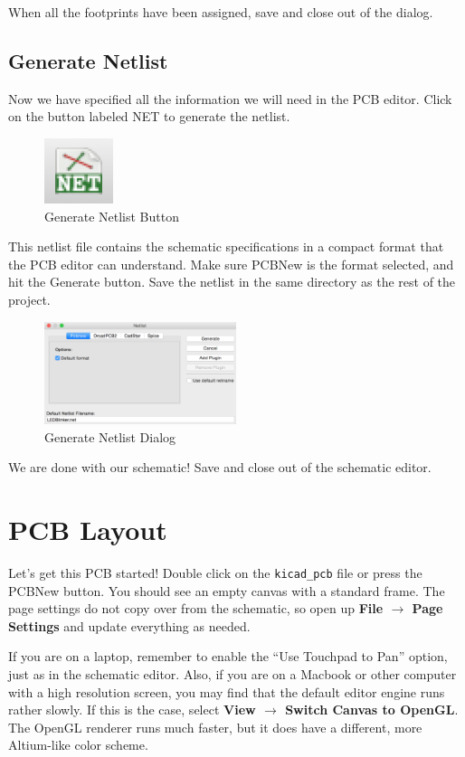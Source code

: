 \documentclass[12pt, oneside]{article}
\begin{document}
When all the footprints have been assigned, save and close out of the dialog.

\subsection{Generate Netlist}
Now we have specified all the information we will need in the PCB editor. Click on the button labeled NET to generate the netlist.

\begin{figure}[H]
\includegraphics{NetlistButton}
\centering
\caption{Generate Netlist Button}
\end{figure}

This netlist file contains the schematic specifications in a compact format that the PCB editor can understand. Make sure PCBNew is the format selected, and hit the Generate button. Save the netlist in the same directory as the rest of the project.

\begin{figure}[H]
\includegraphics[width=0.5\textwidth]{NetlistDialog}
\centering
\caption{Generate Netlist Dialog}
\end{figure}

We are done with our schematic! Save and close out of the schematic editor.

\section{PCB Layout}
Let's get this PCB started! Double click on the \texttt{kicad\_pcb} file or press the PCBNew button. You should see an empty canvas with a standard frame. The page settings do not copy over from the schematic, so open up \textbf{File $\rightarrow$ Page Settings} and update everything as needed.

If you are on a laptop, remember to enable the ``Use Touchpad to Pan'' option, just as in the schematic editor. Also, if you are on a Macbook or other computer with a high resolution screen, you may find that the default editor engine runs rather slowly. If this is the case, select \textbf{View $\rightarrow$ Switch Canvas to OpenGL}. The OpenGL renderer runs much faster, but it does have a different, more Altium-like color scheme.
\end{document}
